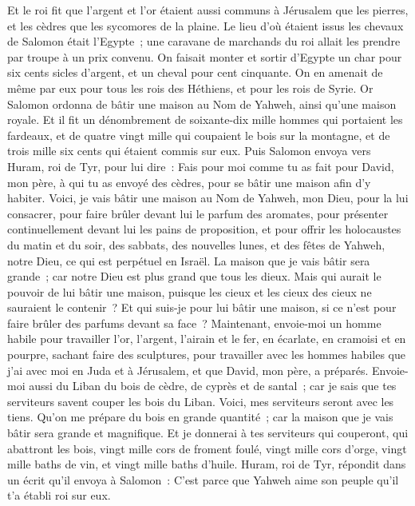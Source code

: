 \begin{multicols}{2}
Et le roi fit que l'argent et l'or étaient aussi communs à Jérusalem que les pierres, et les cèdres que les sycomores de la plaine.
Le lieu d'où étaient issus les chevaux de Salomon était l'Egypte~; une caravane de marchands du roi allait les prendre par troupe à un prix convenu.
On faisait monter et sortir d'Egypte un char pour six cents sicles d'argent, et un cheval pour cent cinquante. On en amenait de même par eux pour tous les rois des Héthiens, et pour les rois de Syrie.
\VerseOne{}Or Salomon ordonna de bâtir une maison au Nom de Yahweh, ainsi qu'une maison royale.
Et il fit un dénombrement de soixante-dix mille hommes qui portaient les fardeaux, et de quatre vingt mille qui coupaient le bois sur la montagne, et de trois mille six cents qui étaient commis sur eux.
Puis Salomon envoya vers Huram, roi de Tyr, pour lui dire~: Fais pour moi comme tu as fait pour David, mon père, à qui tu as envoyé des cèdres, pour se bâtir une maison afin d'y habiter.
Voici, je vais bâtir une maison au Nom de Yahweh, mon Dieu, pour la lui consacrer, pour faire brûler devant lui le parfum des aromates, pour présenter continuellement devant lui les pains de proposition, et pour offrir les holocaustes du matin et du soir, des sabbats, des nouvelles lunes, et des fêtes de Yahweh, notre Dieu, ce qui est perpétuel en Israël.
La maison que je vais bâtir sera grande~; car notre Dieu est plus grand que tous les dieux.
Mais qui aurait le pouvoir de lui bâtir une maison, puisque les cieux et les cieux des cieux ne sauraient le contenir~? Et qui suis-je pour lui bâtir une maison, si ce n'est pour faire brûler des parfums devant sa face~?
Maintenant, envoie-moi un homme habile pour travailler l'or, l'argent, l'airain et le fer, en écarlate, en cramoisi et en pourpre, sachant faire des sculptures, pour travailler avec les hommes habiles que j'ai avec moi en Juda et à Jérusalem, et que David, mon père, a préparés.
Envoie-moi aussi du Liban du bois de cèdre, de cyprès et de santal~; car je sais que tes serviteurs savent couper les bois du Liban. Voici, mes serviteurs seront avec les tiens.
Qu'on me prépare du bois en grande quantité~; car la maison que je vais bâtir sera grande et magnifique.
Et je donnerai à tes serviteurs qui couperont, qui abattront les bois, vingt mille cors de froment foulé, vingt mille cors d'orge, vingt mille baths de vin, et vingt mille baths d'huile.
Huram, roi de Tyr, répondit dans un écrit qu'il envoya à Salomon~: C'est parce que Yahweh aime son peuple qu'il t'a établi roi sur eux.

\end{multicols}
